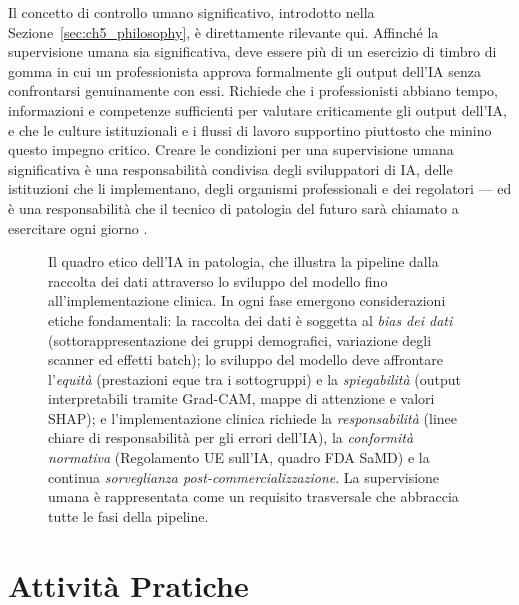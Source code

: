 Il concetto di controllo umano significativo, introdotto nella Sezione~\ref{sec:ch5_philosophy}, è direttamente rilevante qui. Affinché la supervisione umana sia significativa, deve essere più di un esercizio di timbro di gomma in cui un professionista approva formalmente gli output dell'IA senza confrontarsi genuinamente con essi. Richiede che i professionisti abbiano tempo, informazioni e competenze sufficienti per valutare criticamente gli output dell'IA, e che le culture istituzionali e i flussi di lavoro supportino piuttosto che minino questo impegno critico. Creare le condizioni per una supervisione umana significativa è una responsabilità condivisa degli sviluppatori di IA, delle istituzioni che li implementano, degli organismi professionali e dei regolatori — ed è una responsabilità che il tecnico di patologia del futuro sarà chiamato a esercitare ogni giorno \cite{elendu2023}.


\begin{figure}[htbp]
    \centering
    
    \caption{Il quadro etico dell'IA in patologia, che illustra la pipeline dalla raccolta dei dati attraverso lo sviluppo del modello fino all'implementazione clinica. In ogni fase emergono considerazioni etiche fondamentali: la raccolta dei dati è soggetta al \emph{bias dei dati} (sottorappresentazione dei gruppi demografici, variazione degli scanner ed effetti batch); lo sviluppo del modello deve affrontare l'\emph{equità} (prestazioni eque tra i sottogruppi) e la \emph{spiegabilità} (output interpretabili tramite Grad-CAM, mappe di attenzione e valori SHAP); e l'implementazione clinica richiede la \emph{responsabilità} (linee chiare di responsabilità per gli errori dell'IA), la \emph{conformità normativa} (Regolamento UE sull'IA, quadro FDA SaMD) e la continua \emph{sorveglianza post-commercializzazione}. La supervisione umana è rappresentata come un requisito trasversale che abbraccia tutte le fasi della pipeline.}
    \label{fig:ethics_framework}
\end{figure}

\section{Attività Pratiche}
\label{sec:ch5_activities}

